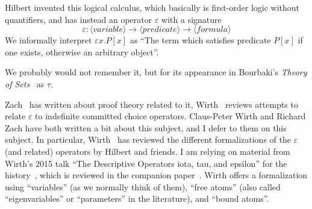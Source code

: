 \begin{node}\label{epsilon-calc-0000}%
Hilbert invented this logical calculus, which basically is first-order
logic without quantifiers, and has instead an operator $\varepsilon$
with a signature
\[\varepsilon\colon\langle\textit{variable}\rangle\to\langle\textit{predicate}\rangle\to\langle\textit{formula}\rangle\]
We informally interpret $\varepsilon x.P[x]$ as ``The term which
satisfies predicate $P[x]$ if one exists, otherwise an arbitrary object''.

We probably would not remember it, but for its appearance in Bourbaki's
\textit{Theory of Sets}~\cite{bourbaki1968theory} as $\tau$.

\begin{node}[References]\label{epsilon-calc-0001}%
Zach~\cite{zach2001practice,zach2016semantics} has written about proof theory related to
it, Wirth~\cite{Wirth2008epsilon,wirth2017simplified} reviews attempts to relate
$\varepsilon$ to indefinite committed choice operators. Claus-Peter Wirth
and Richard Zach have both written a bit about this subject, and I defer
to them on this subject. In particular, Wirth~\cite{wirth2017simplified}
has reviewed the different formalizations of the $\varepsilon$ (and
related) operators by Hilbert and friends.
I am relying on material from Wirth's 2015 talk ``The Descriptive
Operators iota, tau, and epsilon'' for the history~,
which is reviewed in the companion paper~\cite[\S4]{wirth2017simplified}.
Wirth offers a formalization using ``variables'' (as we normally think
of them), ``free atoms'' (also called ``eigenvariables'' or
``parameters'' in the literature), and ``bound atoms''.
\end{node}
\end{node}

